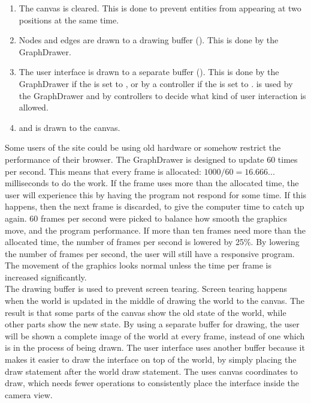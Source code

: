 \begin{enumerate}
    \item The canvas is cleared. This is done to prevent entities from appearing at two positions at the same time.
    \item Nodes and edges are drawn to a drawing buffer (). This is done by the GraphDrawer.
    \item The user interface is drawn to a separate buffer (). This is done by the GraphDrawer if the  is set to , or by a controller if the  is set to .  is used by the GraphDrawer and by controllers to decide what kind of user interaction is allowed.
    \item {} and  is drawn to the canvas.
\end{enumerate}
Some users of the site could be using old hardware or somehow restrict the performance of their browser. The GraphDrawer is designed to update 60 times per second. This means that every frame is allocated: $ 1000 / 60 = 16.666... $ milliseconds to do the work. If the frame uses more than the allocated time, the user will experience this by having the program not respond for some time. If this happens, then the next frame is discarded, to give the computer time to catch up again. 60 frames per second were picked to balance how smooth the graphics move, and the program performance. If more than ten frames need more than the allocated time, the number of frames per second is lowered by 25\%. By lowering the number of frames per second, the user will still have a responsive program. The movement of the graphics looks normal unless the time per frame is increased significantly.
\\[11pt]
The drawing buffer is used to prevent screen tearing. Screen tearing happens when the world is updated in the middle of drawing the world to the canvas. The result is that some parts of the canvas show the old state of the world, while other parts show the new state. By using a separate buffer for drawing, the user will be shown a complete image of the world at every frame, instead of one which is in the process of being drawn. The user interface uses another buffer because it makes it easier to draw the interface on top of the world, by simply placing the draw statement after the world draw statement. The  uses canvas coordinates to draw, which needs fewer operations to consistently place the interface inside the camera view.

